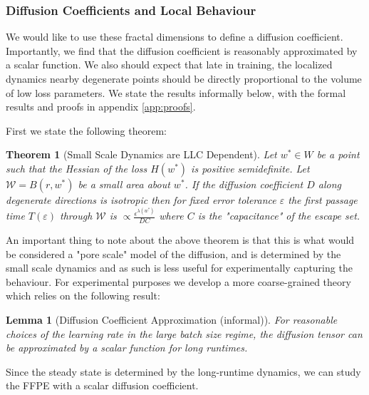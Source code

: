 \documentclass{article} %
\newtheorem{lemma}{Lemma}[section]
\newtheorem{theorem}{Theorem}[section]
\theoremstyle{definition}
\begin{document}
\subsubsection{Diffusion Coefficients and Local Behaviour}
We would like to use these fractal dimensions to define a diffusion coefficient. Importantly, we find that the diffusion coefficient is reasonably approximated by a scalar function. We also should expect that late in training, the localized dynamics nearby degenerate points should be directly proportional to the volume of low loss parameters. We state the results informally below, with the formal results and proofs in appendix \ref{app:proofs}.

First we state the following theorem:
\begin{theorem}[Small Scale Dynamics are LLC Dependent]
    Let $w^* \in W$ be a point such that the Hessian of the loss $H(w^*)$ is positive semidefinite. Let $\mathcal{W} = B(r, w^*)$ be a small area about $w^*$. If the diffusion coefficient $D$ along degenerate directions is isotropic then for fixed error tolerance $\varepsilon$ the first passage time $T(\varepsilon)$ through $\mathcal{W}$ is $\propto \frac{\epsilon^{\lambda(w^*)}}{DC}$ where $C$ is the "capacitance" of the escape set.
\end{theorem}

An important thing to note about the above theorem is that this is what would be considered a "pore scale" model of the diffusion, and is determined by the small scale dynamics and as such is less useful for experimentally capturing the behaviour. For experimental purposes we develop a more coarse-grained theory which relies on the following result:

\begin{lemma}[Diffusion Coefficient Approximation (informal)]
    For reasonable choices of the learning rate in the large batch size regime, the diffusion tensor can be approximated by a scalar function for long runtimes.
\end{lemma}
Since the steady state is determined by the long-runtime dynamics, we can study the FFPE with a scalar diffusion coefficient.
\end{document}
